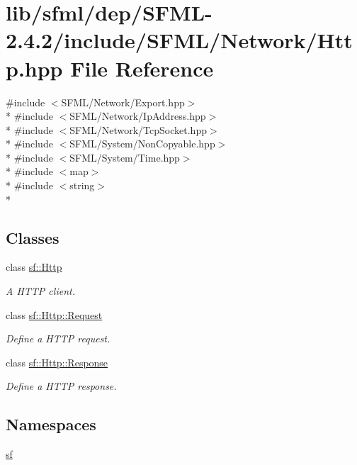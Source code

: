 \hypertarget{sfml_2dep_2_s_f_m_l-2_84_82_2include_2_s_f_m_l_2_network_2_http_8hpp}{\section{lib/sfml/dep/\-S\-F\-M\-L-\/2.4.2/include/\-S\-F\-M\-L/\-Network/\-Http.hpp File Reference}
\label{sfml_2dep_2_s_f_m_l-2_84_82_2include_2_s_f_m_l_2_network_2_http_8hpp}
}
{\ttfamily \#include $<$S\-F\-M\-L/\-Network/\-Export.\-hpp$>$}\\*
{\ttfamily \#include $<$S\-F\-M\-L/\-Network/\-Ip\-Address.\-hpp$>$}\\*
{\ttfamily \#include $<$S\-F\-M\-L/\-Network/\-Tcp\-Socket.\-hpp$>$}\\*
{\ttfamily \#include $<$S\-F\-M\-L/\-System/\-Non\-Copyable.\-hpp$>$}\\*
{\ttfamily \#include $<$S\-F\-M\-L/\-System/\-Time.\-hpp$>$}\\*
{\ttfamily \#include $<$map$>$}\\*
{\ttfamily \#include $<$string$>$}\\*
\subsection*{Classes}
\begin{DoxyCompactItemize}
\item 
class \hyperlink{classsf_1_1_http}{sf\-::\-Http}
\begin{DoxyCompactList}\small\item\em A H\-T\-T\-P client. \end{DoxyCompactList}\item 
class \hyperlink{classsf_1_1_http_1_1_request}{sf\-::\-Http\-::\-Request}
\begin{DoxyCompactList}\small\item\em Define a H\-T\-T\-P request. \end{DoxyCompactList}\item 
class \hyperlink{classsf_1_1_http_1_1_response}{sf\-::\-Http\-::\-Response}
\begin{DoxyCompactList}\small\item\em Define a H\-T\-T\-P response. \end{DoxyCompactList}\end{DoxyCompactItemize}
\subsection*{Namespaces}
\begin{DoxyCompactItemize}
\item 
\hyperlink{namespacesf}{sf}
\end{DoxyCompactItemize}
